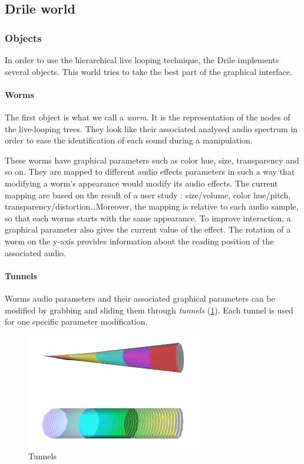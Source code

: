 \subsection{Drile world} 
 \subsubsection{Objects}
 In order to use the hierarchical live looping technique, the Drile implements several objects. This world tries to take the best part of the graphical interface.
\paragraph{Worms}    
 The first object is what we call a \textit{worm}. It is the representation of the nodes of the live-looping trees. They look like their associated analysed audio spectrum in order to ease the identification of each sound during a manipulation.
  
These worms have graphical parameters such as color hue, size, transparency and so on. They are mapped to different audio effects parameters in such a way that modifying a worm's appearance would modify its audio effects. The current mapping are based on the result of a user study : size/volume, color hue/pitch, transparency/distortion\dots Moreover, the mapping is relative to each audio sample, so that each worms starts with the same appearance. To improve interaction, a graphical parameter also gives the current value of the effect. The rotation of a worm on the y-axis provides information about the reading position of the associated audio.

\paragraph{Tunnels}    
Worms audio parameters and their associated graphical parameters can be modified by grabbing and sliding them through \textit{tunnels} (\ref{fig:tunnel}). Each tunnel is used for one specific parameter modification.

\begin{figure}[h!]
\centering\includegraphics[scale=0.55]{image/tunnels.png}
\caption{Tunnels}
\label{fig:tunnel}
\end{figure} 

